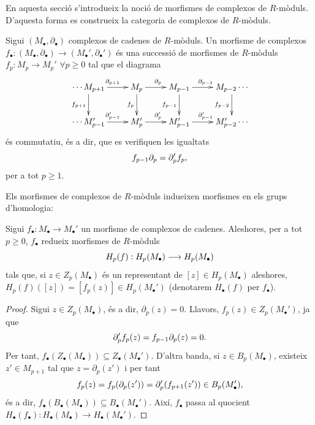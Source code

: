 \documentclass[../main.tex]{subfiles}
\begin{document}
En aquesta secció s'introdueix la noció de morfismes de complexos de $R$-mòduls. D'aquesta forma es construeix la categoria de complexos de $R$-mòduls.

\begin{defi}
 Sigui $(M_\bullet,\partial_\bullet)$ complexos de cadenes de $R$-mòduls. Un morfisme de complexos $f_\bullet:(M_\bullet,\partial_\bullet)\rightarrow(M_\bullet',\partial_\bullet')$ és una successió de morfismes de $R$-mòduls $f_p:M_p\rightarrow M_p'$ $\forall p\geq 0$ tal que el diagrama
\begin{equation}
    \notag
    \xymatrix{
    \cdots M_{p+1}\ar[r]^{\partial_{p+1}}\ar[d]_{f_{p+1}} & M_p\ar[r]^{\partial_p}\ar[d]_{f_p} & M_{p-1} \ar[r]^{\partial_{p-1}}\ar[d]_{f_{p-1}} & M_{p-2} \cdots\ar[d]_{f_{p-2}} \\
    \cdots M_{p-1}' \ar[r]^{\partial_{p-1}'} & M_p'\ar[r]^{\partial_p'} & M_{p-1}'\ar[r]^{\partial_{p-1}'} & M_{p-2}'\cdots
    }
\end{equation}
és commutatiu, és a dir, que es verifiquen les igualtats
\begin{equation}
    \notag
    f_{p-1}\partial_p = \partial_p'f_p,
\end{equation}
per a tot $p\geq 1$.
\end{defi}

Els morfismes de complexos de $R$-mòduls indueixen morfismes en els grups d'homologia:


\begin{lema}
Sigui $f_\bullet:M_\bullet\rightarrow M_\bullet'$ un morfisme de complexos de cadenes. Aleshores, per a tot $p\geq0$, $f_\bullet$ redueix morfismes de $R$-mòduls
\begin{equation}
    \notag
    H_p(f):H_p(M_\bullet)\longrightarrow H_p(M_\bullet)
\end{equation}
tals que, si $z\in Z_p(M_\bullet)$ és un representant de $[z]\in H_p(M_\bullet)$ aleshores, $H_p(f)([z])=[f_p(z)]\in H_p(M_\bullet')$ (denotarem $H_\bullet(f)$ per $f_\bullet$).
\end{lema}
\begin{proof}
Sigui $z\in Z_p(M_\bullet)$, és a dir, $\partial_p(z) = 0$. Llavors, $f_p(z) \in Z_p(M_\bullet')$, ja que
\begin{equation}
    \notag
    \partial_p'f_p(z) = f_{p-1}\partial_p(z) = 0.
\end{equation}
Per tant, $f_\bullet(Z_\bullet(M_\bullet))\subseteq Z_\bullet(M_\bullet')$. D'altra banda, si $z\in B_p(M_\bullet)$, existeix $z'\in M_{p+1}$ tal que $z = \partial_p(z')$ i per tant
\begin{equation}
    \notag
    f_p(z) = f_p(\partial_p(z')) = \partial_p'(f_{p+1}(z'))\in B_p(M_\bullet'),
\end{equation}
és a dir, $f_\bullet(B_\bullet(M_\bullet))\subseteq B_\bullet(M_\bullet')$. Així, $f_\bullet$ passa al quocient $H_\bullet(f_\bullet):H_\bullet(M_\bullet)\rightarrow H_\bullet(M_\bullet')$.
\end{proof}
\end{document}
